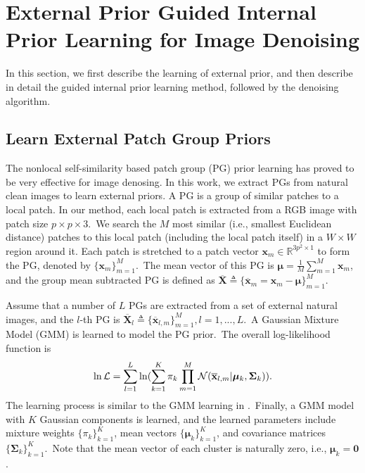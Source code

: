 \section{External Prior Guided Internal Prior Learning for Image Denoising}

In this section, we first describe the learning of external prior, and then describe in detail the guided internal prior learning method, followed by the denoising algorithm.

\subsection{Learn External Patch Group Priors}

The nonlocal self-similarity based patch group (PG) prior learning \cite{pgpd} has proved to be very effective for image denosing. In this work, we extract PGs from natural clean images to learn external priors. A PG is a group of similar patches to a local patch. In our method, each local patch is extracted from a RGB image with patch size $p\times p \times 3$.\ We search the $M$ most similar (i.e., smallest Euclidean distance) patches to this local patch (including the local patch itself) in a $W\times W$ region around it. Each patch is stretched to a patch vector $\mathbf{x}_{m}\in \mathbb{R}^{3p^{2}\times1}$ to form the PG, denoted by $\{\mathbf{x}_{m}\}_{m=1}^{M}$.\ The mean vector of this PG is $\bm{\mu}=\frac{1}{M}\sum_{m=1}^{M}\mathbf{x}_{m}$, and the group mean subtracted PG is defined as $\mathbf{\overline{X}}\triangleq \{\mathbf{\overline{x}}_{m}=\mathbf{x}_{m}-\bm{\mu}\}_{m=1}^{M}$.

Assume that a number of $L$ PGs are extracted from a set of external natural images, and the $l$-th PG is $\mathbf{\overline{X}}_{l}\triangleq \{\mathbf{\overline{x}}_{l,m}\}_{m=1}^{M}, l=1,...,L$.\ A Gaussian Mixture Model (GMM) is learned to model the PG prior.\ The overall log-likelihood function is
\vspace{-2mm}
\begin{equation}\label{equ1}
\vspace{-2mm}
\begin{split}
\ln\mathcal{L}=\sum_{l=1}^{L} \ln(\sum_{k=1}^{K}\pi_{k}\prod_{m=1}^{M}\mathcal{N}(\mathbf{\overline{x}}_{l,m}|\bm{\mu}_{k},\bm{\Sigma}_{k})).
\end{split}
\end{equation}
The learning process is similar to the GMM learning in \cite{pgpd,epll}.\ Finally, a GMM model with $K$ Gaussian components is learned, and the learned parameters include mixture weights $\{\pi_{k}\}_{k=1}^{K}$, mean vectors $\{\bm{\mu}_{k}\}_{k=1}^{K}$, and covariance matrices $\{\bm{\Sigma}_{k}\}_{k=1}^{K}$.\ Note that the mean vector of each cluster is naturally zero, i.e., $\bm{\mu}_{k}=\bm{0}$.  


